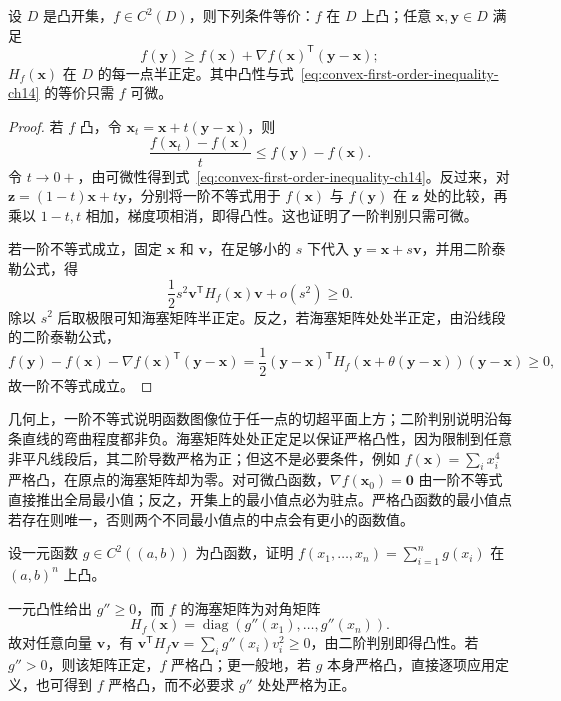 \documentclass[UTF8,12pt,a4paper,fontset=fandol]{ctexbook}
\begin{document}
\begin{theorem}[凸函数的一阶与二阶判别]
\label{thm:multivariable-convexity-tests-ch14}
设 $D$ 是凸开集，$f\in C^2(D)$，则下列条件等价：$f$ 在 $D$ 上凸；任意 $\boldsymbol x,\boldsymbol y\in D$ 满足
\begin{equation}
\label{eq:convex-first-order-inequality-ch14}
    f(\boldsymbol y)\geq f(\boldsymbol x)
       +\nabla f(\boldsymbol x)^{\mathsf T}(\boldsymbol y-\boldsymbol x);
\end{equation}
$H_f(\boldsymbol x)$ 在 $D$ 的每一点半正定。其中凸性与式~\eqref{eq:convex-first-order-inequality-ch14} 的等价只需 $f$ 可微。
\end{theorem}
\begin{proof}
若 $f$ 凸，令 $\boldsymbol x_t=\boldsymbol x+t(\boldsymbol y-\boldsymbol x)$，则
\[
    \frac{f(\boldsymbol x_t)-f(\boldsymbol x)}t
       \leq f(\boldsymbol y)-f(\boldsymbol x).
\]
令 $t\to0+$，由可微性得到式~\eqref{eq:convex-first-order-inequality-ch14}。反过来，对 $\boldsymbol z=(1-t)\boldsymbol x+t\boldsymbol y$，分别将一阶不等式用于 $f(\boldsymbol x)$ 与 $f(\boldsymbol y)$ 在 $\boldsymbol z$ 处的比较，再乘以 $1-t,t$ 相加，梯度项相消，即得凸性。这也证明了一阶判别只需可微。

若一阶不等式成立，固定 $\boldsymbol x$ 和 $\boldsymbol v$，在足够小的 $s$ 下代入 $\boldsymbol y=\boldsymbol x+s\boldsymbol v$，并用二阶泰勒公式，得
\[
    \frac12s^2\boldsymbol v^{\mathsf T}H_f(\boldsymbol x)\boldsymbol v+o(s^2)\geq0.
\]
除以 $s^2$ 后取极限可知海塞矩阵半正定。反之，若海塞矩阵处处半正定，由沿线段的二阶泰勒公式，
\[
    f(\boldsymbol y)-f(\boldsymbol x)-\nabla f(\boldsymbol x)^{\mathsf T}(\boldsymbol y-\boldsymbol x)
    =\frac12(\boldsymbol y-\boldsymbol x)^{\mathsf T}
       H_f(\boldsymbol x+\theta(\boldsymbol y-\boldsymbol x))
       (\boldsymbol y-\boldsymbol x)\geq0,
\]
故一阶不等式成立。
\end{proof}

几何上，一阶不等式说明函数图像位于任一点的切超平面上方；二阶判别说明沿每条直线的弯曲程度都非负。海塞矩阵处处正定足以保证严格凸性，因为限制到任意非平凡线段后，其二阶导数严格为正；但这不是必要条件，例如 $f(\boldsymbol x)=\sum_i x_i^4$ 严格凸，在原点的海塞矩阵却为零。对可微凸函数，$\nabla f(\boldsymbol x_0)=\boldsymbol0$ 由一阶不等式直接推出全局最小值；反之，开集上的最小值点必为驻点。严格凸函数的最小值点若存在则唯一，否则两个不同最小值点的中点会有更小的函数值。

\begin{example}
\label{ex:separable-convex-function-ch14}
设一元函数 $g\in C^2((a,b))$ 为凸函数，证明 $f(x_1,\ldots,x_n)=\sum_{i=1}^n g(x_i)$ 在 $(a,b)^n$ 上凸。
\end{example}
\begin{solve}
一元凸性给出 $g''\geq0$，而 $f$ 的海塞矩阵为对角矩阵
\[
    H_f(\boldsymbol x)=\operatorname{diag}(g''(x_1),\ldots,g''(x_n)).
\]
故对任意向量 $\boldsymbol v$，有 $\boldsymbol v^{\mathsf T}H_f\boldsymbol v=\sum_i g''(x_i)v_i^2\geq0$，由二阶判别即得凸性。若 $g''>0$，则该矩阵正定，$f$ 严格凸；更一般地，若 $g$ 本身严格凸，直接逐项应用定义，也可得到 $f$ 严格凸，而不必要求 $g''$ 处处严格为正。
\end{solve}
\end{document}
